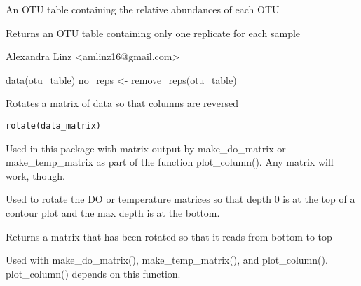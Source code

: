 \documentclass[a4paper]{book}
\begin{document}
%
\begin{Arguments}
\begin{ldescription}
\item[\code{table}] 
An OTU table containing the relative abundances of each OTU

\end{ldescription}
\end{Arguments}
%
\begin{Value}
Returns an OTU table containing only one replicate for each sample
\end{Value}
%
\begin{Author}\relax
Alexandra Linz <amlinz16@gmail.com>
\end{Author}
%
\begin{Examples}
\begin{ExampleCode}
 data(otu_table)
 no_reps <- remove_reps(otu_table)
\end{ExampleCode}
\end{Examples}
%
\begin{Description}\relax
Rotates a matrix of data so that columns are reversed
\end{Description}
%
\begin{Usage}
\begin{verbatim}
rotate(data_matrix)
\end{verbatim}
\end{Usage}
%
\begin{Arguments}
\begin{ldescription}
\item[\code{data\_matrix}] 
Used in this package with matrix output by make\_do\_matrix or make\_temp\_matrix as part of the function plot\_column(). Any matrix will work, though.


\end{ldescription}
\end{Arguments}
%
\begin{Details}\relax
Used to rotate the DO or temperature matrices so that depth 0 is at the top of a contour plot and the max depth is at the bottom.
\end{Details}
%
\begin{Value}
Returns a matrix that has been rotated so that it reads from bottom to top
\end{Value}
%
\begin{Note}\relax
Used with make\_do\_matrix(), make\_temp\_matrix(), and plot\_column(). plot\_column() depends on this function.
\end{Note}
\end{document}
